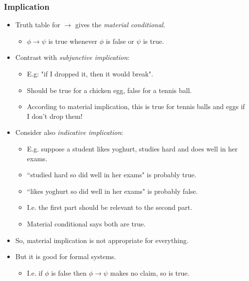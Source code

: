 \documentclass[handout]{beamer}
\newcommand{\ra}{\rightarrow}
\begin{document}
\begin{frame}
\frametitle{Implication}
\begin{itemize}
\item Truth table for $\ra$ gives the \emph{material conditional}.
\begin{itemize}
\item $\phi\ra\psi$ is true whenever $\phi$ is false or $\psi$ is true. 
\end{itemize}
\item  Contrast with \emph{subjunctive implication}: 
\begin{itemize}
\item E.g: "if I dropped it, then it would break". 
\item Should be true for a chicken egg, false for a tennis ball.
\item According to material implication, this is true for tennis balls and eggs if I don't drop them! 
\end{itemize}
\item Consider also \emph{indicative implication}: 
\begin{itemize}
\item E.g. suppose a student likes yoghurt, studies hard and does well in her exams. 
\item ``studied hard so did well in her exams" is probably true.
\item  ``likes yoghurt so did well in her exams" is probably false. 
\item I.e. the first part should be relevant to the second part.
\item Material conditional says both are true.
\end{itemize}
\item So, material implication is not appropriate for everything. 
\item But it is good for formal systems. 
\begin{itemize}
\item I.e. if $\phi$ is false then $\phi\ra \psi$ makes no claim, so is true.
\end{itemize}
\end{itemize}
\end{frame}
\end{document}
